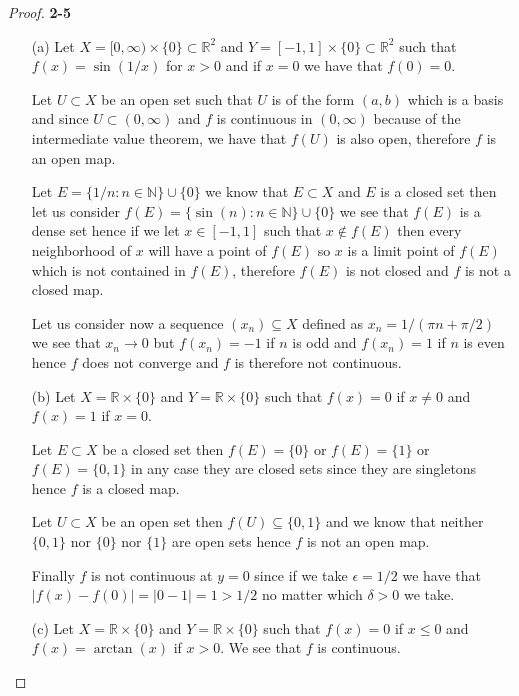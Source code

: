 \documentclass[11pt]{article}
\newcommand{\N}{\mathbb{N}}
\newcommand{\R}{\mathbb{R}}
\theoremstyle{definition}
\begin{document}
\begin{proof}{\textbf{2-5}}
\begin{itemize}
    \item [(a)] Let $X = [0, \infty) \times \{0\} \subset \R^2$ and 
    $Y = [-1, 1] \times \{0\} \subset \R^2$ such that
    $f(x) = \sin(1/x)$ for $x > 0$ and if $x = 0$ we have that $f(0) = 0$.
    
    Let $U \subset X$ be an open set such that $U$ is of the form $(a,b)$
    which is a basis and
    since $U\subset (0, \infty)$ and $f$ is continuous in $(0, \infty)$ because
    of the intermediate value theorem, we have that $f(U)$ is also open,
    therefore $f$ is an open map. 

    Let $E = \{1/n: n \in \N\} \cup \{0\}$ we know that $E \subset X$ and $E$
    is a closed set then let us consider
    $f(E) = \{\sin(n): n\in \N\} \cup \{0\}$ we see that $f(E)$ is a dense set
    hence if we let $x \in [-1,1]$ such that $x \not\in f(E)$ then every
    neighborhood of $x$ will have a point of $f(E)$ so $x$ is a limit point
    of $f(E)$ which is not contained in $f(E)$, therefore $f(E)$ is not
    closed and $f$ is not a closed map.

    Let us consider now a sequence $(x_n) \subseteq X$ defined as
    $x_n = 1/(\pi n + \pi/2)$ we see that
    $x_n \to 0$ but $f(x_n) = -1$ if $n$ is odd and $f(x_n) = 1$ if $n$
    is even hence $f$ does not converge and $f$ is therefore not continuous.

    \item [(b)] Let $X = \R\times\{0\}$ and $Y = \R\times \{0\}$ such
    that $f(x) = 0$ if $x \neq 0$ and $f(x) = 1$ if $x = 0$.

    Let $E \subset X$ be a closed set then $f(E) = \{0\}$ or $f(E) = \{1\}$
    or $f(E) = \{0, 1\}$ in any case they are closed sets since they are
    singletons hence $f$ is a closed map.

    Let $U \subset X$ be an open set then $f(U) \subseteq \{0,1\}$ and we know
    that neither $\{0,1\}$ nor $\{0\}$ nor $\{1\}$ are open sets hence
    $f$ is not an open map.

    Finally $f$ is not continuous at $y=0$ since if we take $\epsilon = 1/2$ we have
    that $|f(x) - f(0)| = |0 - 1| = 1 > 1/2$ no matter which $\delta > 0$
    we take.

    \item [(c)] Let $X = \R \times \{0\}$ and $Y = \R \times \{0\}$
    such that $f(x) = 0$ if $x \leq 0$ and $f(x) = \arctan(x)$ if $x > 0$.
    We see that $f$ is continuous.


\end{itemize}
\end{proof}
\end{document}
